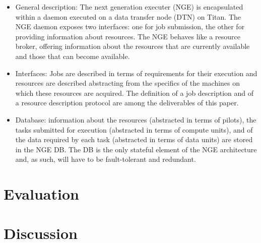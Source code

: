 \documentclass[10pt, conference, compsocconf]{IEEEtran}
\begin{document}
\begin{itemize}

    \item General description: The next generation executer (NGE) is
    encapsulated within a daemon executed on a data transfer node (DTN) on
    Titan. The NGE daemon exposes two interfaces: one for job submission, the
    other for providing information about resources. The NGE behaves like a
    resource broker, offering information about the resources that are currently
    available and those that can become available.

    \item Interfaces: Jobs are described in terms of requirements for their
    execution and resources are described abstracting from the specifics of the
    machines on which these resources are acquired. The definition of a job
    description and of a resource description protocol are among the
    deliverables of this paper.

    \item Database: information about the resources (abstracted in terms of
    pilots), the tasks submitted for execution (abstracted in terms of compute
    units), and of the data required by each task (abstracted in terms of data
    units) are stored in the NGE DB\@. The DB is the only stateful element of the NGE architecture and, as such, will have to be fault-tolerant and redundant.

\end{itemize}

\section{Evaluation}
\label{sec:evaluation}


\section{Discussion}
\label{sec:discussion}


\end{document}
